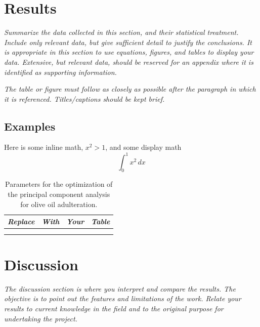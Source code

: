 \documentclass[11pt,a4paper,oneside]{report}
\newcommand{\instructions}[1]{{\color{black}\itshape #1}}
\begin{document}

\chapter{Results}
\label{results}

\instructions{Summarize the data collected in this section, and their
statistical treatment. Include only relevant data, but give sufficient
detail to justify the conclusions. It is appropriate in this section to
use equations, figures, and tables to display your data. Extensive, but
relevant data, should be reserved for an appendix where it is identified
as supporting information.}

\instructions{The table or figure must follow as closely as possible after the
paragraph in which it is referenced. Titles/captions should be kept
brief.}

\section{Examples}

Here is some inline math, $x^2 > 1$, and some display math
\begin{equation}
  \int_0^1 x^2 \, dx
\end{equation}

\begin{table}[htbp]
\centering
\begin{tabular}{@{}llll@{}}
\toprule
\emph{Replace} & \emph{With} & \emph{Your} & \emph{Table} \\
\midrule
& & & \\
& & & \\
\bottomrule
\end{tabular}
\caption{Parameters for the optimization of the principal component analysis for
olive oil adulteration.}
\label{tbl:2}
\end{table}





\chapter{Discussion}
\label{discussion}

\instructions{The discussion section is where you interpret and compare the
results. The objective is to point out the features and limitations of
the work. Relate your results to current knowledge in the field and to
the original purpose for undertaking the project.}
\end{document}
